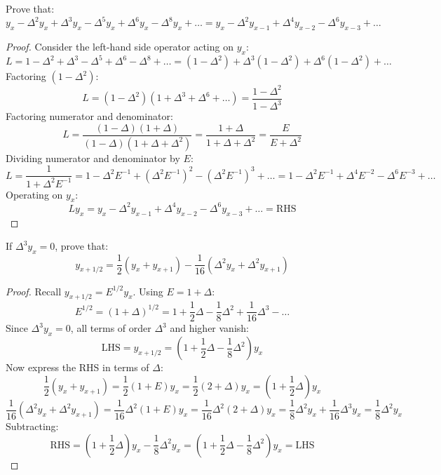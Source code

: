 \documentclass[11pt,a4paper]{article}
\begin{document}
\begin{theorembox}
Prove that:
\begin{equation}
    y_x - \Delta^2 y_x + \Delta^3 y_x - \Delta^5 y_x + \Delta^6 y_x - \Delta^8 y_x + \dots = y_x - \Delta^2 y_{x-1} + \Delta^4 y_{x-2} - \Delta^6 y_{x-3} + \dots
\end{equation}
\end{theorembox}
\begin{proof}
Consider the left-hand side operator acting on $y_x$:
$$L = 1 - \Delta^2 + \Delta^3 - \Delta^5 + \Delta^6 - \Delta^8 + \dots = (1 - \Delta^2) + \Delta^3(1 - \Delta^2) + \Delta^6(1 - \Delta^2) + \dots$$
Factoring $(1 - \Delta^2)$:
$$L = (1 - \Delta^2)(1 + \Delta^3 + \Delta^6 + \dots) = \frac{1 - \Delta^2}{1 - \Delta^3}$$
Factoring numerator and denominator:
$$L = \frac{(1 - \Delta)(1 + \Delta)}{(1 - \Delta)(1 + \Delta + \Delta^2)} = \frac{1 + \Delta}{1 + \Delta + \Delta^2} = \frac{E}{E + \Delta^2}$$
Dividing numerator and denominator by $E$:
$$L = \frac{1}{1 + \Delta^2 E^{-1}} = 1 - \Delta^2 E^{-1} + (\Delta^2 E^{-1})^2 - (\Delta^2 E^{-1})^3 + \dots = 1 - \Delta^2 E^{-1} + \Delta^4 E^{-2} - \Delta^6 E^{-3} + \dots$$
Operating on $y_x$:
$$L y_x = y_x - \Delta^2 y_{x-1} + \Delta^4 y_{x-2} - \Delta^6 y_{x-3} + \dots = \text{RHS}$$
\end{proof}

\begin{theorembox}
If $\Delta^3 y_x = 0$, prove that:
\begin{equation}
    y_{x+1/2} = \frac{1}{2}(y_x + y_{x+1}) - \frac{1}{16}(\Delta^2 y_x + \Delta^2 y_{x+1})
\end{equation}
\end{theorembox}
\begin{proof}
Recall $y_{x+1/2} = E^{1/2} y_x$. Using $E = 1 + \Delta$:
$$E^{1/2} = (1 + \Delta)^{1/2} = 1 + \frac{1}{2}\Delta - \frac{1}{8}\Delta^2 + \frac{1}{16}\Delta^3 - \dots$$
Since $\Delta^3 y_x = 0$, all terms of order $\Delta^3$ and higher vanish:
$$\text{LHS} = y_{x+1/2} = \left(1 + \frac{1}{2}\Delta - \frac{1}{8}\Delta^2\right) y_x$$
Now express the RHS in terms of $\Delta$:
$$\frac{1}{2}(y_x + y_{x+1}) = \frac{1}{2}(1 + E) y_x = \frac{1}{2}(2 + \Delta) y_x = \left(1 + \frac{1}{2}\Delta\right) y_x$$
$$\frac{1}{16}(\Delta^2 y_x + \Delta^2 y_{x+1}) = \frac{1}{16}\Delta^2(1 + E) y_x = \frac{1}{16}\Delta^2(2 + \Delta) y_x = \frac{1}{8}\Delta^2 y_x + \frac{1}{16}\Delta^3 y_x = \frac{1}{8}\Delta^2 y_x$$
Subtracting:
$$\text{RHS} = \left(1 + \frac{1}{2}\Delta\right) y_x - \frac{1}{8}\Delta^2 y_x = \left(1 + \frac{1}{2}\Delta - \frac{1}{8}\Delta^2\right) y_x = \text{LHS}$$
\end{proof}
\end{document}
